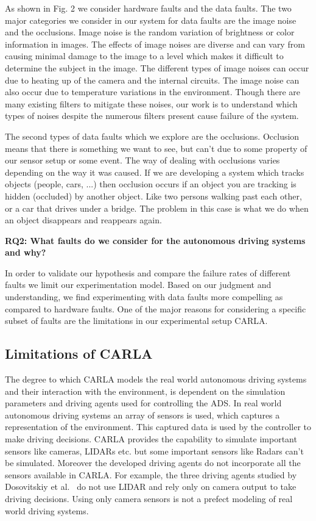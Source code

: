 As shown in Fig. 2 we consider hardware faults and the data faults. The two major categories we consider in our system for data faults are the image noise and the occlusions. Image noise is the random variation of brightness or color information in images.
The effects of image noises are diverse and can vary from causing minimal damage to the image to
a level which makes it difficult to determine the subject in the image. The different types of image noises can occur due to heating up of the camera and the internal circuits. The image noise can also occur due to temperature variations in the environment. Though there are many existing filters to mitigate these noises, our work is to understand which types of noises despite the numerous filters present cause failure of the system. 

The second types of data faults which we explore are the occlusions. Occlusion means that there is something we want to see, but can't due to some property of our sensor setup or some event. The way of dealing with occlusions varies depending on the way it was caused. If we are developing a system which tracks objects (people, cars, ...) then occlusion occurs if an object you are tracking is hidden (occluded) by another object. Like two persons walking past each other, or a car that drives under a bridge. The problem in this case is what we do when an object disappears and reappears again.

\textbf{RQ2: What faults do we consider for the autonomous driving systems and why?}

In order to validate our hypothesis and compare the failure rates of different faults we limit our experimentation model. Based on our judgment and understanding, we find experimenting with data faults more compelling as compared to hardware faults. One of the major reasons for considering a specific subset of faults are the limitations in our experimental setup CARLA.

\subsection{Limitations of CARLA}
The degree to which CARLA models the real world autonomous driving systems and their interaction with the environment, is dependent on the simulation parameters and driving agents used for controlling the ADS. In real world autonomous driving systems an array of sensors is used, which captures a representation of the environment. This captured data is used by the controller to make driving decisions. CARLA provides the capability to simulate important sensors like cameras, LIDARs etc. but some important sensors like Radars can't be simulated. Moreover the developed driving agents do not incorporate all the sensors available in CARLA. For example, the three driving agents studied by Dosovitskiy et al.~\cite{Dosovitskiy17} do not use LIDAR and rely only on camera output to take driving decisions. Using only camera sensors is not a prefect modeling of real world driving systems.

